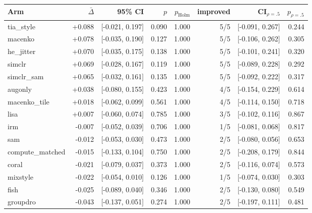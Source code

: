 \begin{tabular}{lrrrrrrr}
\toprule
Arm & $\bar\Delta$ & 95\% CI & $p$ & $p_\text{Holm}$ & improved & CI$_{\rho=.5}$ & $p_{\rho=.5}$ \\
\midrule
tia\_style & +0.088 & [-0.021, 0.197] & 0.090 & 1.000 & 5/5 & [-0.091, 0.267] & 0.244 \\
macenko & +0.078 & [-0.035, 0.190] & 0.127 & 1.000 & 5/5 & [-0.106, 0.262] & 0.305 \\
he\_jitter & +0.070 & [-0.035, 0.175] & 0.138 & 1.000 & 5/5 & [-0.101, 0.241] & 0.320 \\
simclr & +0.069 & [-0.028, 0.167] & 0.119 & 1.000 & 5/5 & [-0.089, 0.228] & 0.292 \\
simclr\_sam & +0.065 & [-0.032, 0.161] & 0.135 & 1.000 & 5/5 & [-0.092, 0.222] & 0.317 \\
augonly & +0.038 & [-0.080, 0.155] & 0.423 & 1.000 & 4/5 & [-0.154, 0.229] & 0.614 \\
macenko\_tile & +0.018 & [-0.062, 0.099] & 0.561 & 1.000 & 4/5 & [-0.114, 0.150] & 0.718 \\
lisa & +0.007 & [-0.060, 0.074] & 0.785 & 1.000 & 3/5 & [-0.102, 0.116] & 0.867 \\
irm & -0.007 & [-0.052, 0.039] & 0.706 & 1.000 & 1/5 & [-0.081, 0.068] & 0.817 \\
sam & -0.012 & [-0.053, 0.030] & 0.473 & 1.000 & 2/5 & [-0.080, 0.056] & 0.653 \\
compute\_matched & -0.015 & [-0.133, 0.104] & 0.750 & 1.000 & 2/5 & [-0.208, 0.179] & 0.844 \\
coral & -0.021 & [-0.079, 0.037] & 0.373 & 1.000 & 2/5 & [-0.116, 0.074] & 0.573 \\
mixstyle & -0.022 & [-0.054, 0.010] & 0.126 & 1.000 & 1/5 & [-0.074, 0.030] & 0.303 \\
fish & -0.025 & [-0.089, 0.040] & 0.346 & 1.000 & 2/5 & [-0.130, 0.080] & 0.549 \\
groupdro & -0.043 & [-0.137, 0.051] & 0.274 & 1.000 & 2/5 & [-0.197, 0.111] & 0.481 \\
\bottomrule
\end{tabular}
